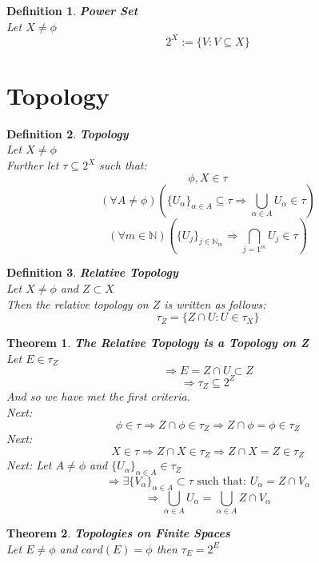 \documentclass[12pt]{extarticle}
\theoremstyle{plain}
\newtheorem{thm}{Theorem}[section]
\theoremstyle{plain}
\theoremstyle{Definition}
\newtheorem{def.}{Definition}[section]
\theoremstyle{Definition}
\theoremstyle{plain}
\begin{document}
\begin{def.} \textbf{Power Set} \\ 
	Let $X \not = \phi$ \\ 
	$$2^X := \{V : V \subseteq X\}$$
\end{def.}
\section{Topology}
\begin{def.} \textbf{Topology} \\
	Let $X \not = \phi$ \\ 
	Further let $\tau \subseteq 2^X$ such that: \\ 
	$$\phi,X \in \tau$$
	$$(\forall A \not = \phi)\left(\{U_\alpha\}_{\alpha \in A} \subseteq \tau \Rightarrow \bigcup_{\alpha \in A} U_\alpha \in \tau\right)$$
	$$(\forall m \in \mathbb{N})\left(\{U_j\}_{j\in \mathbb{N}_m} \Rightarrow \bigcap_{j=1^m} U_j \in \tau\right)$$
\end{def.}
\begin{def.} \textbf{Relative Topology} \\
	Let $X \not = \phi$ and $Z \subset X$ \\ 
	Then the relative topology on $Z$ is written as follows: \\ 
	$$\tau_Z = \{Z \cap U : U \in \tau_X\}$$
\end{def.}
\begin{thm} \textbf{The Relative Topology is a Topology on Z} \\
	Let $E \in \tau_Z$ \\
	$$\Rightarrow E = Z \cap U \subset Z$$
	$$\Rightarrow \tau_Z \subseteq 2^Z$$
	And so we have met the first criteria. \\ 
	Next: 
	$$\phi \in \tau \Rightarrow Z \cap \phi \in \tau_Z \Rightarrow Z \cap \phi = \phi \in \tau_Z$$
	Next: 
	$$X \in \tau \Rightarrow Z \cap X \in \tau_Z \Rightarrow Z \cap X = Z \in \tau_Z$$
	Next: 
	Let $A \not = \phi$ and $\{U_\alpha\}_{\alpha \in A} \in \tau_Z$ \\ 
	$$\Rightarrow \exists \{V_\alpha\}_{\alpha \in A} \subset \tau \text{ such that: } U_\alpha = Z \cap V_\alpha$$
	$$\Rightarrow \bigcup_{\alpha \in A} U_\alpha = \bigcup_{\alpha \in A} Z \cap V_\alpha$$
\end{thm}
\begin{thm} \textbf{Topologies on Finite Spaces} \\
	Let $E \not = \phi$ and $card(E) = \phi$ then $\tau_E = 2^E$	
\end{thm}
\end{document}

